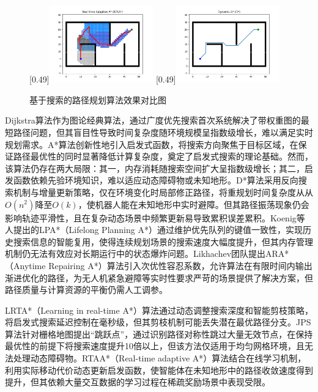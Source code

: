 \documentclass[master,academic]{ysuthesis} %
\begin{document}
\begin{figure}[H]
			[0.49\textwidth]{\includegraphics[width=0.4\textwidth]{fig/插图/A-search/RTAAstar.png}}
			[0.49\textwidth]{\includegraphics[width=0.4\textwidth]{fig/插图/A-search/Dstar.png}}
			\caption{基于搜索的路径规划算法效果对比图}
			\label{fig:基于搜索的路径规划}
		\end{figure}
		Dijkstra算法作为图论经典算法，通过广度优先搜索首次系统解决了带权重图的最短路径问题，但其盲目性导致时间复杂度随环境规模呈指数级增长，难以满足实时规划需求。A*算法创新性地引入启发式函数，将搜索方向聚焦于目标区域，在保证路径最优性的同时显著降低计算复杂度，奠定了启发式搜索的理论基础。然而，该算法仍存在两大局限：其一，内存消耗随搜索空间扩大呈指数级增长；其二，启发函数依赖先验环境知识，难以适应动态障碍物或未知地形。D*算法采用反向搜索机制与增量更新策略，仅在环境变化时局部修正路径，将重规划时间复杂度从从$O(n^2)$降至$O(k)$，使机器人能在未知地形中实时避障。但其路径振荡现象仍会影响轨迹平滑性，且在复杂动态场景中频繁更新易导致累积误差累积。Koenig等人提出的LPA*（Lifelong Planning A*）通过维护优先队列的键值一致性，实现历史搜索信息的智能复用，使得连续规划场景的搜索速度大幅度提升，但其内存管理机制仍无法有效应对长期运行中的状态爆炸问题。Likhachev团队提出ARA*（Anytime Repairing A*）算法引入次优性容忍系数，允许算法在有限时间内输出渐进优化的路径，为无人机紧急避障等实时性要求严苛的场景提供了解决方案，但路径质量与计算资源的平衡仍需人工调参。

		LRTA*（Learning in real-time A*）算法通过动态调整搜索深度和智能剪枝策略，将启发式搜索延迟控制在毫秒级，但其剪枝机制可能丢失潜在最优路径分支。JPS算法针对栅格地图提出“跳跃点”，通过识别路径对称性跳过大量无效节点，在保持最优性的前提下将搜索速度提升10倍以上，但该方法仅适用于均匀网格环境，且无法处理动态障碍物。RTAA*（Real-time adaptive A*）算法结合在线学习机制，利用实际移动代价动态更新启发函数，使智能体在未知地形中的路径收敛速度得到提升，但其依赖大量交互数据的学习过程在稀疏奖励场景中表现受限。
\end{document}
